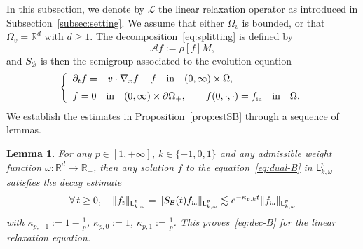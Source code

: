 \documentclass[11pt]{amsart}
\newtheorem{lemma}[theorem]{Lemma}
\theoremstyle{definition}
\theoremstyle{remark}
\numberwithin{equation}{section}
\newcommand\R{{\mathbb R}}
\def\BB{{\mathcal B}}
\newcommand{\fa}{\forall \,}
\newcommand{\init}{\text{{\tiny {\rm in}}}}
\newcommand{\sfL}{\mathsf{L}}
\begin{document}
In this subsection, we denote by $\mathcal{L}$ the linear relaxation operator as introduced in Subsection~\ref{subsec:setting}. We assume that either $\Omega_v$ is bounded, or that $\Omega_v = \mathbb{R}^d$ with $d \ge 1$. The decomposition~\eqref{eq:splitting} is defined by
\begin{equation}
  \label{eq:dec-relaxSB}
  {\mathcal A} f  :=  \rho[f] M,
\end{equation}
and $S_\BB$ is then the semigroup associated to the evolution equation
\begin{equation}
  \label{eq:dual-B}
  \left\{
    \begin{array}{l}
      \partial_t f = -  v \cdot \nabla_x  f - f   \quad\hbox{in}\quad (0,\infty) \times \Omega,\\[2mm]
      f = 0  \quad\hbox{in}\quad (0,\infty) \times \partial\Omega_+,  \qquad f(0,\cdot,\cdot) = f_\init \quad \hbox{in}\quad \Omega.
    \end{array}
  \right.
\end{equation}
We establish the estimates in Proposition~\ref{prop:estSB} through a sequence of lemmas.
\begin{lemma}
  \label{lem:SBrelaxation-estim1}
  For any $p \in [1,+\infty]$, $k \in \{ -1, 0, 1 \}$ and any admissible weight function $\omega : \R^d \to \R_+$,
  then any solution $f$ to the equation~\eqref{eq:dual-B} in $\sfL^{p}_{k,\omega}$ satisfies the decay estimate
  \begin{equation}
    \label{eq:dec-B-relax}
    \fa t \ge 0, \quad \| f_t \|_{\sfL^{p}_{k,\omega}} = \| S_\BB(t) f_\init \|_{\sfL^{p}_{k,\omega}} \lesssim e^{- \kappa_{p,k} t} \| f_\init \|_{\sfL^{p}_{k,\omega}}
  \end{equation}
  with $\kappa_{p,-1} := 1-\frac{1}{p}$, $\kappa_{p,0} := 1$, $\kappa_{p,1} := \frac{1}{p}$. This proves~\eqref{eq:dec-B} for the linear relaxation equation.
\end{lemma}
\end{document}

